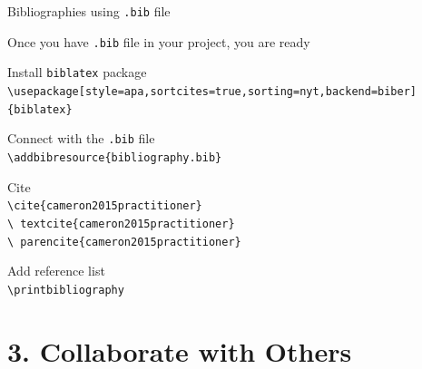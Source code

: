 \documentclass[13pt]{beamer}
\newcommand{\itemA}{\item[\textcolor{black}{\textbullet}]}
\newcommand{\green}{\textcolor{colorgreen}}
\begin{document}
\begin{frame}{Bibliographies using \texttt{.bib} file}

 \begin{fullpageitemize}
        
    \itemA Once you have \texttt{.bib} file in your project, you are ready \hfill \break
        \begin{fullpageitemize}
        \item [\textcolor{black}{\textopenbullet}] Install \green{\texttt{biblatex}} package 
        {\scriptsize \texttt{\green{\textbackslash usepackage}[style=apa,sortcites=true,sorting=nyt,backend=biber]\{biblatex\}}}
        
        \item [\textcolor{black}{\textopenbullet}] Connect with the \texttt{.bib} file \\  {\footnotesize\texttt{\green{\textbackslash addbibresource}\{bibliography.bib\}}}
        \item [\textcolor{black}{\textopenbullet}] Cite \\ 
        {\footnotesize\texttt{\green{\textbackslash cite}\{cameron2015practitioner\}}} \hspace{10mm}
        {\latolightfont \cite{cameron2015practitioner}}\\
        {\footnotesize\texttt{\green{\textbackslash
        textcite}\{cameron2015practitioner\}}} \hspace{4mm}
        {\latolightfont \textcite{cameron2015practitioner}}\\
        {\footnotesize \texttt{\green{\textbackslash
        parencite}\{cameron2015practitioner\}}} \hspace{2mm}
        {\latolightfont \parencite{cameron2015practitioner}}\\
        
        \item [\textcolor{black}{\textopenbullet}] Add reference list\\
        {\footnotesize \texttt{\green{\textbackslash printbibliography}}}
        
        
        \end{fullpageitemize}
\end{fullpageitemize}

\end{frame}

\section{3. Collaborate with Others}
\end{document}
